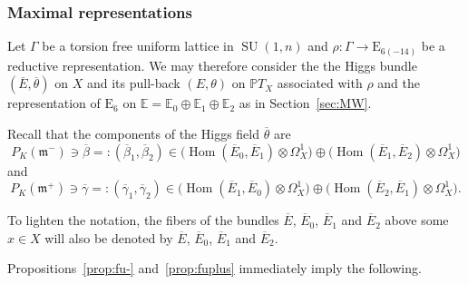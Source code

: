 \documentclass[10pt]{amsart}
\theoremstyle{plain}
\theoremstyle{definition}
\let\ov\overline
\DeclareMathOperator{\Hom}{Hom}
\DeclareMathOperator{\SU}{SU}
\newcommand{\bE}{\mathbb{E}}
\newcommand{\PTX}{{\mathbb{P}T_X}}
\newcommand{\fm}{\mathfrak{m}}
\newcommand{\ovE}{\ov{E}}
\newcommand{\ovb}{\ov{\beta}}
\newcommand{\ovg}{\ov{\gamma}}
\newcommand{\ovt}{\ov{\theta}}
\begin{document}
\subsubsection{Maximal representations}

Let $\Gamma$ be a torsion free uniform lattice in $\SU(1,n)$ and $\rho:\Gamma\to \mathrm{E}_{6(-14)}$ be a
reductive representation.
We may therefore
consider the the Higgs bundle $(\ovE,\ovt)$ on $X$ and its pull-back $(E,\theta)$ on $\PTX$
associated with $\rho$ and the representation of $\mathrm{E}_{6}$ on
$\bE=\bE_0\oplus\bE_1\oplus\bE_2$ as in Section~\ref{sec:MW}.

Recall that the components of the Higgs field $\ovt$ are
$$
P_K(\fm^-)\ni\ovb=:(\ovb_1,\ovb_2)\in\bigl(\Hom(\ovE_0,\ovE_1)\otimes\Omega^1_X \bigr)\oplus \bigl(\Hom(\ovE_1,\ovE_2)\otimes\Omega^1_X \bigr)
$$
and
$$
P_K(\fm^+)\ni\ovg=:(\ovg_1,\ovg_2)\in \bigl(\Hom(\ovE_1,\ovE_0)\otimes\Omega^1_X \bigr)\oplus \bigl(\Hom(\ovE_2,\ovE_1)\otimes\Omega^1_X \bigr).
$$

To lighten the notation, the fibers of the bundles $\ovE$, $\ovE_0$, $\ovE_1$ and
$\ovE_2$ above some $x\in X$ will also be denoted by $\ovE$, $\ovE_0$, $\ovE_1$ and
$\ovE_2$.

Propositions~\ref{prop:fu-} and~\ref{prop:fuplus} immediately imply the following.
\end{document}
